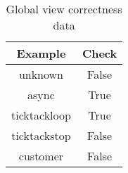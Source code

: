 \begin{table}[!ht]
\centering
\begin{tabular}{|c|c|}
\hline
Example & Check \\ 
\hline
unknown & False \\ 
async & True \\ 
ticktackloop & True \\ 
ticktackstop & False \\ 
customer & False \\ 
\hline
\end{tabular}
\caption{Global view correctness data}
\label{tab:corrbench}
\end{table}